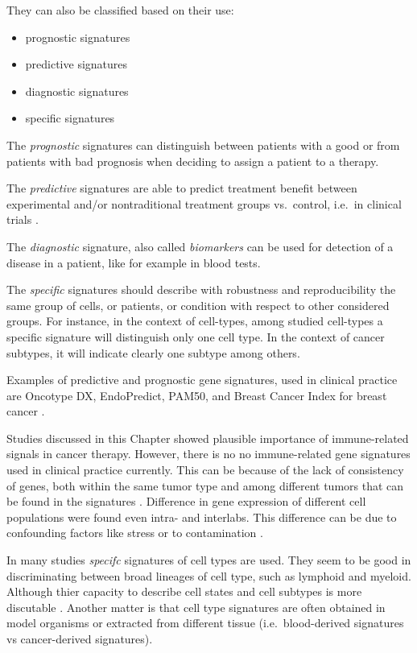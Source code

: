 \documentclass[12pt,]{book}
\providecommand{\tightlist}{%
  \setlength{\itemsep}{0pt}\setlength{\parskip}{0pt}}
\theoremstyle{definition}
\theoremstyle{definition}
\theoremstyle{definition}
\theoremstyle{remark}
\begin{document}
They can also be classified based on their use:

\begin{itemize}
\tightlist
\item
  prognostic signatures
\item
  predictive signatures
\item
  diagnostic signatures
\item
  specific signatures
\end{itemize}

The \emph{prognostic} signatures can distinguish between patients with a
good or from patients with bad prognosis when deciding to assign a
patient to a therapy.

The \emph{predictive} signatures are able to predict treatment benefit
between experimental and/or nontraditional treatment groups vs.~control,
i.e.~in clinical trials \citep{Michiels2016}.

The \emph{diagnostic} signature, also called \emph{biomarkers} can be
used for detection of a disease in a patient, like for example in blood
tests.

The \emph{specific} signatures should describe with robustness and
reproducibility the same group of cells, or patients, or condition with
respect to other considered groups. For instance, in the context of
cell-types, among studied cell-types a specific signature will
distinguish only one cell type. In the context of cancer subtypes, it
will indicate clearly one subtype among others.

Examples of predictive and prognostic gene signatures, used in clinical
practice are Oncotype DX, EndoPredict, PAM50, and Breast Cancer Index
for breast cancer \citep{Harris2016}.

Studies discussed in this Chapter showed plausible importance of
immune-related signals in cancer therapy. However, there is no no
immune-related gene signatures used in clinical practice currently. This
can be because of the lack of consistency of genes, both within the same
tumor type and among different tumors that can be found in the
signatures \citep{Chifman2016}. Difference in gene expression of
different cell populations were found even intra- and interlabs. This
difference can be due to confounding factors like stress or to
contamination \citep{Heng2008}.

In many studies \emph{specifc} signatures of cell types are used. They
seem to be good in discriminating between broad lineages of cell type,
such as lymphoid and myeloid. Although thier capacity to describe cell
states and cell subtypes is more discutable \citep{Chifman2016}. Another
matter is that cell type signatures are often obtained in model
organisms or extracted from different tissue (i.e.~blood-derived
signatures vs cancer-derived signatures).
\end{document}
